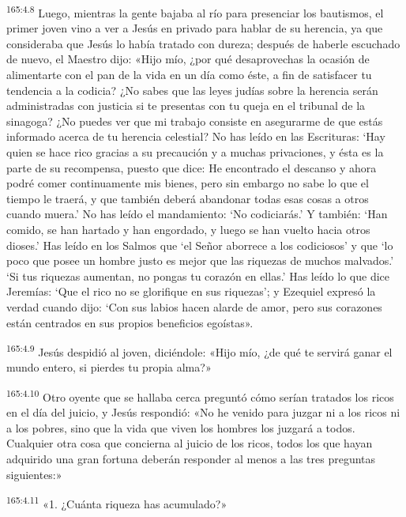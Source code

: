 \par 
\textsuperscript{165:4.8} Luego, mientras la gente bajaba al río para presenciar los bautismos, el primer joven vino a ver a Jesús en privado para hablar de su herencia, ya que consideraba que Jesús lo había tratado con dureza; después de haberle escuchado de nuevo, el Maestro dijo: «Hijo mío, ¿por qué desaprovechas la ocasión de alimentarte con el pan de la vida en un día como éste, a fin de satisfacer tu tendencia a la codicia? ¿No sabes que las leyes judías sobre la herencia serán administradas con justicia si te presentas con tu queja en el tribunal de la sinagoga? ¿No puedes ver que mi trabajo consiste en asegurarme de que estás informado acerca de tu herencia celestial? No has leído en las Escrituras: `Hay quien se hace rico gracias a su precaución y a muchas privaciones, y ésta es la parte de su recompensa, puesto que dice: He encontrado el descanso y ahora podré comer continuamente mis bienes, pero sin embargo no sabe lo que el tiempo le traerá, y que también deberá abandonar todas esas cosas a otros cuando muera.' No has leído el mandamiento: `No codiciarás.' Y también: `Han comido, se han hartado y han engordado, y luego se han vuelto hacia otros dioses.' Has leído en los Salmos que `el Señor aborrece a los codiciosos' y que `lo poco que posee un hombre justo es mejor que las riquezas de muchos malvados.' `Si tus riquezas aumentan, no pongas tu corazón en ellas.' Has leído lo que dice Jeremías: `Que el rico no se glorifique en sus riquezas'; y Ezequiel expresó la verdad cuando dijo: `Con sus labios hacen alarde de amor, pero sus corazones están centrados en sus propios beneficios egoístas».

\par 
\textsuperscript{165:4.9} Jesús despidió al joven, diciéndole: «Hijo mío, ¿de qué te servirá ganar el mundo entero, si pierdes tu propia alma?»

\par 
\textsuperscript{165:4.10} Otro oyente que se hallaba cerca preguntó cómo serían tratados los ricos en el día del juicio, y Jesús respondió: «No he venido para juzgar ni a los ricos ni a los pobres, sino que la vida que viven los hombres los juzgará a todos. Cualquier otra cosa que concierna al juicio de los ricos, todos los que hayan adquirido una gran fortuna deberán responder al menos a las tres preguntas siguientes:»

\par 
\textsuperscript{165:4.11} «1. ¿Cuánta riqueza has acumulado?»


